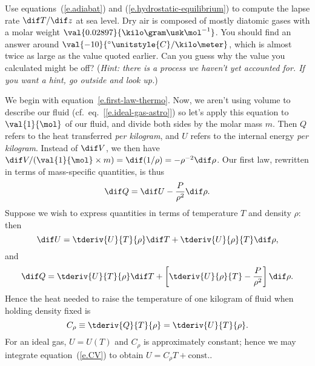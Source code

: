 \begin{exercisebox}
Use equations~(\ref{e.adiabat}) and (\ref{e.hydrostatic-equilibrium}) to compute the lapse rate $\dif T/\dif z$ at sea level.  Dry air is composed of mostly diatomic gases with a molar weight $\val{0.02897}{\kilo\gram\usk\mol^{-1}}$. You should find an answer around $\val{-10}{^{\circ}\unitstyle{C}/\kilo\meter}$, which is almost twice as large as the value quoted earlier.  Can you guess why the value you calculated might be off? (\emph{Hint: there is a process we haven't yet accounted for.  If you want a hint, go outside and look up.})
\end{exercisebox}

\begin{sidebar}
We begin with equation~\ref{e.first-law-thermo}. 
Now, we aren't using volume to describe our fluid (cf.\ eq.~[\ref{e.ideal-gas-astro}]) so let's apply this equation to $\val{1}{\mol}$ of our fluid, and divide both sides by the molar mass $m$.  Then $Q$ refers to the heat transferred \emph{per kilogram}, and $U$ refers to the internal energy \emph{per kilogram}.  Instead of $\dif V$, we then have $\dif V/(\val{1}{\mol}\times m) = \dif(1/\rho) = -\rho^{-2}\dif\rho$.  Our first law, rewritten in terms of mass-specific quantities, is thus
\begin{equation}\label{e.first-law-thermo-astro}
	\dif Q = \dif U -\frac{P}{\rho^{2}}\dif \rho.
\end{equation}
Suppose we wish to express quantities in terms of temperature $T$ and density $\rho$: then
\[ \dif U = \tderiv{U}{T}{\rho}\dif T + \tderiv{U}{\rho}{T}\dif \rho, \]
and
\[ \dif Q = \tderiv{U}{T}{\rho}\dif T + \left[\tderiv{U}{\rho}{T} - \frac{P}{\rho^{2}}\right]\dif \rho. \]
Hence the heat needed to raise the temperature of one kilogram of fluid when holding density fixed is
\begin{equation}\label{e.CV}
C_{\rho} \equiv \tderiv{Q}{T}{\rho} = \tderiv{U}{T}{\rho}.
\end{equation}
For an ideal gas, $U = U(T)$ and $C_{\rho}$ is approximately constant; hence we may integrate equation~(\ref{e.CV}) to obtain $U = C_{\rho}T + \textrm{const.}$.


\end{sidebar}
